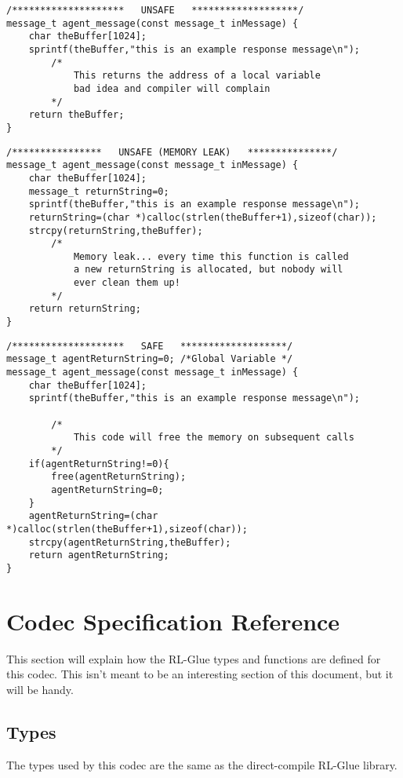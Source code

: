 \documentclass[11pt]{article}
\begin{document}
\begin{verbatim}
/********************   UNSAFE   *******************/
message_t agent_message(const message_t inMessage) {
    char theBuffer[1024];
    sprintf(theBuffer,"this is an example response message\n");
        /*
            This returns the address of a local variable
            bad idea and compiler will complain
        */
    return theBuffer;
}
\end{verbatim}

\begin{verbatim}
/****************   UNSAFE (MEMORY LEAK)   ***************/
message_t agent_message(const message_t inMessage) {
    char theBuffer[1024];
    message_t returnString=0;
    sprintf(theBuffer,"this is an example response message\n");
    returnString=(char *)calloc(strlen(theBuffer+1),sizeof(char));
    strcpy(returnString,theBuffer);
        /*
            Memory leak... every time this function is called
            a new returnString is allocated, but nobody will
            ever clean them up!
        */
    return returnString;
}
\end{verbatim}

\begin{verbatim}
/********************   SAFE   *******************/
message_t agentReturnString=0; /*Global Variable */	
message_t agent_message(const message_t inMessage) {
    char theBuffer[1024];
    sprintf(theBuffer,"this is an example response message\n");

        /*
            This code will free the memory on subsequent calls
        */
    if(agentReturnString!=0){
        free(agentReturnString);
        agentReturnString=0;
    }
    agentReturnString=(char *)calloc(strlen(theBuffer+1),sizeof(char));
    strcpy(agentReturnString,theBuffer);
    return agentReturnString;
}
\end{verbatim}




\section{Codec Specification Reference}
This section will explain how the RL-Glue types and functions are defined for this codec.  This isn't meant to be an interesting section of this document, but it will
be handy.

\subsection{Types}
The types used by this codec are the same as the direct-compile RL-Glue library.
\end{document}
